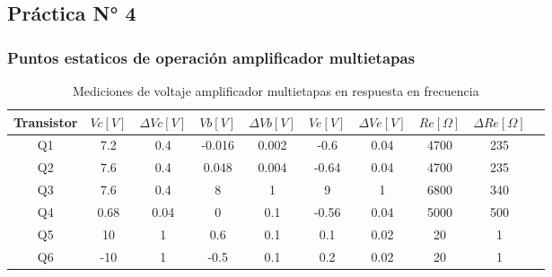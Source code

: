 \subsection{Práctica N° 4}

\subsubsection{Puntos estaticos de operación amplificador multietapas}

\begin{table}[h!]
\centering
\begin{tabular}{|c|c|c|c|c|c|c|c|c|c|}
\hline
\textbf{Transistor} & \textbf{\(Vc[V]\)} & \textbf{\(\varDelta Vc[V]\)} & \textbf{\(Vb[V]\)} & \textbf{\(\varDelta Vb[V]\)} & \textbf{\(Ve[V]\)} & \textbf{\(\varDelta Ve[V]\)} & \textbf{\(Re[\Omega]\)} & \textbf{\(\varDelta Re[\Omega]\)} \\ \hline
Q1 & 7.2 & 0.4 & -0.016 & 0.002 & -0.6 & 0.04 & 4700 & 235 \\ \hline
Q2 & 7.6 & 0.4 & 0.048 & 0.004 & -0.64 & 0.04 & 4700 & 235 \\ \hline
Q3 & 7.6 & 0.4 & 8 & 1 & 9 & 1 & 6800 & 340 \\ \hline
Q4 & 0.68 & 0.04 & 0 & 0.1 & -0.56 & 0.04 & 5000 & 500 \\ \hline
Q5 & 10 & 1 & 0.6 & 0.1 & 0.1 & 0.02 & 20 & 1 \\ \hline
Q6 & -10 & 1 & -0.5 & 0.1 & 0.2 & 0.02 & 20 & 1 \\ \hline
\end{tabular}
\caption{Mediciones de voltaje amplificador multietapas en respuesta en frecuencia}
\label{tab:med-voltaje-amplificador-multietapas-respuesta-frecuencia}
\end{table}


